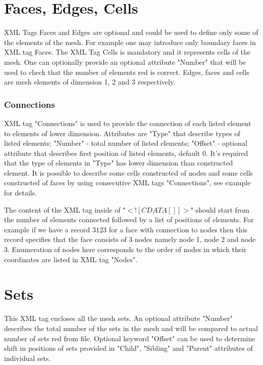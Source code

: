 \documentclass[14pt]{article}
\begin{document}
\section{Faces, Edges, Cells}
XML Tags Faces and Edges are optional and could be used to define only some of the elements of the mesh. For example one may introduce only boundary faces in XML tag Faces. The XML Tag Cells is mandatory and it represents cells of the mesh. One can optionally provide an optional attribute "Number" that will be used to check that the number of elements red is correct. Edges, faces and cells are mesh elements of dimension 1, 2 and 3 respectively.
\subsubsection{Connections}
XML tag "Connections" is used to provide the connection of each listed element to elements of lower dimension. Attributes are "Type" that describe types of listed elements; "Number" - total number of listed elements; "Offset" - optional attribute that describes first position of listed elements, default 0. It's required that the type of elements in "Type" has lower dimension than constructed element. It is possible to describe some cells constructed of nodes and some cells constructed of faces by using consecutive XML tags "Connections", see example for details. 

The content of the XML tag inside of "$<![CDATA[]]>$" should start from the number of elements connected followed by a list of positions of elements. For example if we have a record $3 1 2 3$ for a face with connection to nodes then this record specifies that the face consists of 3 nodes namely node 1, node 2 and node 3. Enumeration of nodes here corresponds to the order of nodes in which their coordinates are listed in XML tag "Nodes".
\section{Sets}
This XML tag encloses all the mesh sets. An optional attribute "Number" describes the total number of the sets in the mesh and will be compared to actual number of sets red from file. Optional keyword "Offset" can be used to determine shift in positions of sets provided in "Child", "Sibling" and "Parent" attributes of individual sets.
\end{document}
